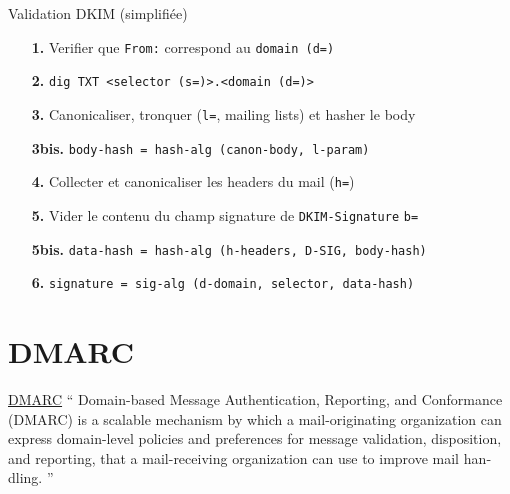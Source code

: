 \documentclass{beamer}
\begin{document}
\begin{frame}{Validation DKIM (simplifiée)}
    \begin{itemize}
        \item[\textbf{1.}] Verifier que \texttt{From:} correspond au \texttt{domain (d=)}
        \item[\textbf{2.}] \texttt{dig TXT <selector (s=)>.<domain (d=)>}
        \item[\textbf{3.}] Canonicaliser, tronquer (\texttt{l=}, mailing lists) et hasher le body
        \item[\textbf{3bis.}] \texttt{body-hash    =  hash-alg (canon-body, l-param)}
        \item[\textbf{4.}] Collecter et canonicaliser les headers du mail (\texttt{h=})
        \item[\textbf{5.}] Vider le contenu du champ signature de \texttt{DKIM-Signature} \texttt{b=}
        \item[\textbf{5bis.}] \texttt{data-hash    =  hash-alg (h-headers, D-SIG, body-hash)}
        \item[\textbf{6.}] \texttt{signature    =  sig-alg (d-domain, selector, data-hash)}
    \end{itemize}
\end{frame}

\section{DMARC}

\begin{frame}{\href{https://datatracker.ietf.org/doc/html/rfc7489}{DMARC}}
    \foreignquote{english}{
        Domain-based Message Authentication, Reporting, and Conformance (DMARC)
        is a scalable mechanism by which a mail-originating organization can
        express domain-level policies and preferences for message validation,
        disposition, and reporting, that a mail-receiving organization can use
        to improve mail handling.
   }
\end{frame}
\end{document}
